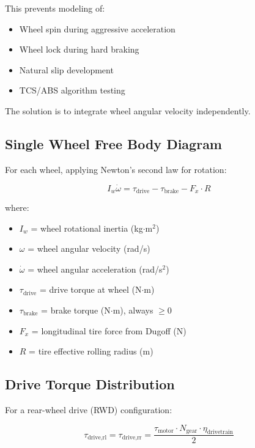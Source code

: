 \documentclass[11pt,a4paper]{article}
\begin{document}
This prevents modeling of:
\begin{itemize}
    \item Wheel spin during aggressive acceleration
    \item Wheel lock during hard braking
    \item Natural slip development
    \item TCS/ABS algorithm testing
\end{itemize}

The solution is to integrate wheel angular velocity independently.

\subsection{Single Wheel Free Body Diagram}

For each wheel, applying Newton's second law for rotation:

\begin{equation}
\boxed{I_w \dot{\omega} = \tau_{\text{drive}} - \tau_{\text{brake}} - F_x \cdot R}
\label{eq:wheel_dynamics}
\end{equation}

where:
\begin{itemize}
    \item $I_w$ = wheel rotational inertia (kg$\cdot$m$^2$)
    \item $\omega$ = wheel angular velocity (rad/s)
    \item $\dot{\omega}$ = wheel angular acceleration (rad/s$^2$)
    \item $\tau_{\text{drive}}$ = drive torque at wheel (N$\cdot$m)
    \item $\tau_{\text{brake}}$ = brake torque (N$\cdot$m), always $\geq 0$
    \item $F_x$ = longitudinal tire force from Dugoff (N)
    \item $R$ = tire effective rolling radius (m)
\end{itemize}

\subsection{Drive Torque Distribution}

For a rear-wheel drive (RWD) configuration:

\begin{equation}
\tau_{\text{drive,rl}} = \tau_{\text{drive,rr}} = \frac{\tau_{\text{motor}} \cdot N_{\text{gear}} \cdot \eta_{\text{drivetrain}}}{2}
\end{equation}
\end{document}
